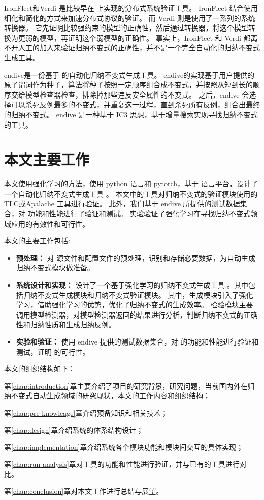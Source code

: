 IronFleet\cite{IronFleet}和Verdi\cite{Verdi} 是比较早在 \TLA 上实现的分布式系统验证工具。
IronFleet 结合使用细化和简化的方式来加速分布式协议的验证。
而 Verdi 则是使用了一系列的系统转换器。
它先证明比较强约束的模型的正确性，然后通过转换器，将这个模型转换为更弱的模型，再证明这个弱模型的正确性。
事实上，IronFleet 和 Verdi 都离不开人工的加入来验证归纳不变式的正确性，并不是一个完全自动化的归纳不变式生成工具。

endive\cite{endive}是一份基于 \TLA 的自动化归纳不变式生成工具。
endive的实现基于用户提供的原子谓词作为种子，算法将种子按照一定顺序组合成不变式，并按照从短到长的顺序交给模型检查器检查，排除掉那些违反安全属性的不变式。
之后，endive 会选择可以杀死反例最多的不变式，并重复这一过程，直到杀死所有反例，组合出最终的归纳不变式。
endive 是一种基于 IC3 思想，基于增量搜索实现寻找归纳不变式的工具。

\section{本文主要工作}

本文使用强化学习的方法，使用 python 语言和 pytorch，基于 \TLA 语言平台，设计了一个自动化归纳不变式生成工具 \rltla。
本文中的工具对归纳不变式的验证模块使用的 TLC或Apalache 工具进行验证。
此外，我们基于 endive 所提供的测试数据集合，对 \rltla 功能和性能进行了验证和测试。
实验验证了强化学习在寻找归纳不变式领域应用的有效性和可行性。

本文的主要工作包括:
\begin{itemize}
    \item \textbf{预处理：} 对 \TLA 源文件和配置文件的预处理，识别和存储必要数据，为自动生成归纳不变式模块做准备。
    \item \textbf{系统设计和实现：} 设计了一个基于强化学习的归纳不变式生成工具 \rltla。其中包括归纳不变式生成模块和归纳不变式验证模块。
    其中，生成模块引入了强化学习，借助强化学习的优势，优化了归纳不变式的生成效率。
    检验模块主要调用模型检测器，对模型检测器返回的结果进行分析，判断归纳不变式的正确性和归纳性质和生成归纳反例。
    \item \textbf{实验和验证：} 使用 endive 提供的测试数据集合，对 \rltla 的功能和性能进行验证和测试，证明 \rltla 的可行性。
\end{itemize}

本文的组织结构如下：

第\ref{chap:introduction}章主要介绍了项目的研究背景，研究问题，当前国内外在归纳不变式自动生成领域的研究现状，本文的工作内容和组织结构；

第\ref{chap:pre-knowleage}章介绍预备知识和相关技术；

第\ref{chap:design}章介绍系统的体系结构设计；

第\ref{chap:implementation}章介绍系统各个模块功能和模块间交互的具体实现；

第\ref{chap:run-analysis}章对工具的功能和性能进行验证，并与已有的工具进行对比。

第\ref{chap:conclusion}章对本文工作进行总结与展望。

